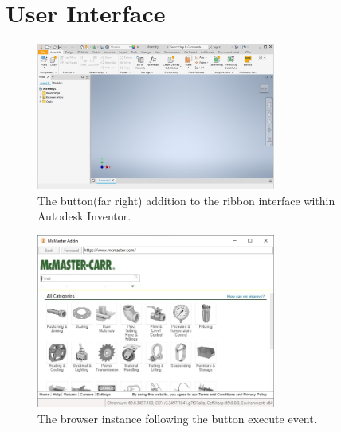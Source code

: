 \documentclass[12pt, letterpaper]{article}
\begin{document}
\section{User Interface}
\begin{figure}[H]
    \centering
    \includegraphics[width=0.7\textwidth]{Figures/mcMasterButton.JPG}
    \caption{The button(far right) addition to the ribbon interface within Autodesk Inventor.}
\end{figure}
\begin{figure}[H]
    \centering
    \includegraphics[width=0.7\textwidth]{Figures/webBrowserView.jpg}
    \caption{The browser instance following the button execute event.}
\end{figure}
\end{document}
